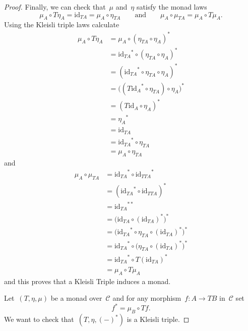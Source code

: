 \documentclass[a4paper]{article}
\theoremstyle{plain}
\theoremstyle{definition}
\newcommand{\id}{\mathrm{id}}
\newcommand{\cat}[1]{\mathcal{#1}}
\begin{document}
\begin{proof}
    Finally, we can check that~\(\mu\) and~\(\eta\) satisfy the monad laws
    \[
        \mu_{A}\circ T\eta_{A} = \id_{TA} = \mu_{A}\circ\eta_{TA}
        \qquad\text{and}\qquad
        \mu_{A}\circ \mu_{TA}
        = \mu_{A} \circ T\mu_{A}.
    \]
    Using the Kleisli triple laws calculate
    \begin{align*}
        \mu_{A} \circ T\eta_{A}
            &= \mu_{A} \circ (\eta_{TA} \circ \eta_{A})^{\ast} \\
            &= {\id_{TA}}^{\ast} \circ (\eta_{TA} \circ \eta_{A})^{\ast} \\
            &= ({\id_{TA}}^{\ast} \circ \eta_{TA} \circ \eta_{A})^{\ast} \\
            &= \bigl(({T\id_{A}}^{\ast} \circ \eta_{TA}) \circ \eta_{A}\bigr)^{\ast} \\
            &= (T\id_{A} \circ \eta_{A})^{\ast} \\
            &= {\eta_{A}}^{\ast} \\
            &= \id_{TA} \\
            &= {\id_{TA}}^{\ast} \circ \eta_{TA} \\
            &= \mu_{A} \circ \eta_{TA}
    \end{align*}
    and
    \begin{align*}
        \mu_{A} \circ \mu_{TA}
            &= {\id_{TA}}^{\ast} \circ {\id_{TTA}}^{\ast} \\
            &= ({\id_{TA}}^{\ast} \circ \id_{TTA})^{\ast} \\
            &= {\id_{TA}}^{\ast\ast} \\
            &= \bigl(\id_{TA} \circ (\id_{TA})^{\ast}\bigr)^{\ast} \\
            &= \bigl({\id_{TA}}^{\ast} \circ \eta_{TA}\circ(\id_{TA})^{\ast}\bigr)^{\ast} \\
            &= {\id_{TA}}^{\ast} \circ \bigl(\eta_{TA}\circ(\id_{TA})^{\ast}\bigr)^{\ast} \\
            &= {\id_{TA}}^{\ast} \circ T(\id_{TA})^{\ast} \\
            &= \mu_{A} \circ T\mu_{A}
    \end{align*}
    and this proves that a Kleisli Triple induces a monad.

    Let~\((T,\eta,\mu)\) be a monad over~\(\cat{C}\) and for any
    morphism~\(f:A\longrightarrow TB\) in~\(\cat{C}\) set
    \begin{equation}
        \label{eq:kleisli-ast-in-monad}
        f^{\ast} = \mu_{B} \circ Tf.
    \end{equation}
    We want to check that~\((T,\eta,(-)^{\ast})\) is a Kleisli triple.


\end{proof}
\end{document}
